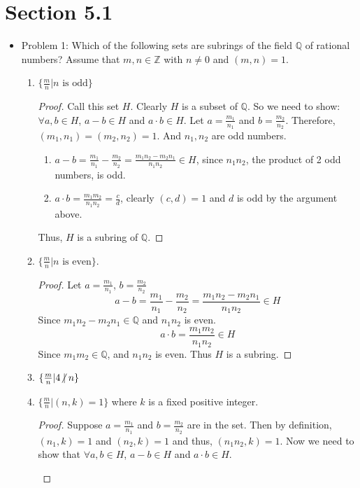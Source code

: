 \documentclass[hidelinks,12pt]{article}
\title{\scalebox{2}{Math 531 Homework 9}}
\author{\scalebox{1.5}{Theo Koss}}
\date{April 2021}
\newcommand{\Z}{\mathbb{Z}}
\newcommand{\Q}{\mathbb{Q}}
\begin{document}
\maketitle
\section{Section 5.1}
\begin{itemize}
    \item Problem 1: Which of the following sets are subrings of the field $\Q$ of rational numbers? Assume that $m,n\in\Z$ with $n\neq0$ and $(m,n)=1$.\begin{enumerate}[label=(\alph*)]
        \item $\{\frac{m}{n}|n\text{ is odd}\}$ \begin{proof}Call this set $H$. Clearly $H$ is a subset of $\Q$. So we need to show: $\forall a,b\in H$, $a-b\in H$ and $a\cdot b\in H$. Let $a=\frac{m_1}{n_1}$ and $b=\frac{m_2}{n_2}$. Therefore, $(m_1,n_1)=(m_2,n_2)=1$. And $n_1,n_2$ are odd numbers.\begin{enumerate}[label=\roman*]
            \item $a-b=\frac{m_1}{n_1}-\frac{m_2}{n_2}=\frac{m_1n_2-m_2n_1}{n_1n_2}\in H$, since $n_1n_2$, the product of 2 odd numbers, is odd.
            \item $a\cdot b=\frac{m_1m_2}{n_1n_2}=\frac{c}{d}$, clearly $(c,d)=1$ and $d$ is odd by the argument above.
        \end{enumerate}Thus, $H$ is a subring of $\Q$. \end{proof}
        \item $\{\frac{m}{n}|n\text{ is even}\}$.\begin{proof}Let $a=\frac{m_1}{n_1}$, $b=\frac{m_2}{n_2}$ $$a-b=\frac{m_1}{n_1}-\frac{m_2}{n_2}=\frac{m_1n_2-m_2n_1}{n_1n_2}\in H$$ Since $m_1n_2-m_2n_1\in\Q$ and $n_1n_2$ is even. $$a\cdot b=\frac{m_1m_2}{n_1n_2}\in H$$ Since $m_1m_2\in\Q$, and $n_1n_2$ is even. Thus $H$ is a subring.
        \end{proof}
        \item $\{\frac{m}{n}|4\centernot|n\}$
        \item $\{\frac{m}{n}|(n,k)=1\}$ where $k$ is a fixed positive integer.\begin{proof}
        Suppose $a=\frac{m_1}{n_1}$ and $b=\frac{m_2}{n_2}$ are in the set. Then by definition, $(n_1,k)=1$ and $(n_2,k)=1$ and thus, $(n_1n_2,k)=1$. Now we need to show that $\forall a,b\in H$, $a-b\in H$ and $a\cdot b\in H$.\begin{enumerate}[label=\roman*]

\end{enumerate}
\end{proof}
\end{enumerate}
\end{itemize}
\end{document}
